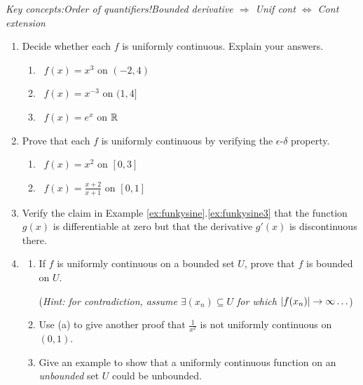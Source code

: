 \begin{exercises}{}{}	
	\emph{Key concepts:\quad Order of quantifiers!\quad Bounded derivative $\Rightarrow$ Unif cont $\Leftrightarrow$ Cont extension}

	\begin{enumerate}
	 	\item Decide whether each $f$ is uniformly continuous. Explain your answers.
	 	\begin{enumerate}
	 	  \item {} 
	 	  \ $f(x)=x^3$ on $(-2,4)$
	 	  \setcounter{enumii}{2}
	 	  \item \makebox[180pt][l]{$f(x)=x^{-3}$ on $(0,4]$\hfill (d)} 
	 	  \ $f(x)=x^{-3}$ on $(1,4]$
	 	  \setcounter{enumii}{4}
	 	  \item {} 
	 	  \ $f(x)=e^x$ on $\mathbb{R}$
	 	\end{enumerate}
	 	 
	 	 
	  \item%
	  Prove that each $f$ is uniformly continuous by verifying the $\epsilon$-$\delta$ property.
	   \begin{enumerate}
		  \item {} 
		  \ $f(x)=x^2$ on $[0,3]$
		  \setcounter{enumii}{2}
		  \item \makebox[180pt][l]{$f(x)=\frac 1{x^2}$ on $[\frac 12,\infty)$\hfill (d)} 
		  \ $f(x)=\frac{x+2}{x+1}$ on $[0,1]$
	  \end{enumerate}
  
  
	  \item\label{exs:funkysine} Verify the claim in Example \ref*{ex:funkysine}.\ref{ex:funkysine3} that the function $g(x)$ is differentiable at zero\footnotemark{} but that the derivative $g'(x)$ is discontinuous there.
  
  
	  \item%
	  \begin{enumerate}
	  	\item If $f$ is uniformly continuous on a bounded set $U$, prove that $f$ is bounded on $U$.\par
	  	(\emph{Hint: for contradiction, assume $\exists (x_n)\subseteq U$ for which $\left| f(x_n)\right|\to\infty\ldots$})
	  	\item Use (a) to give another proof that $\frac 1{x^2}$ is not uniformly continuous on $(0,1)$.
	  	\item Give an example to show that a uniformly continuous function on an \emph{unbounded} set $U$ could be unbounded.
	  \end{enumerate}
  

\end{enumerate}
\end{exercises}
